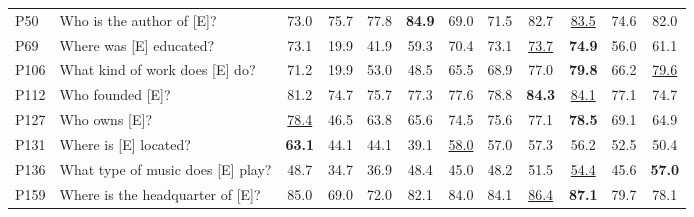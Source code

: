 \documentclass[letterpaper]{article} %
\begin{document}
\begin{table}
{\begin{tabular}{llcccccccccc}
			P50                                                   & Who is the author of [E]?               & 73.0             & 75.7            & 77.8               & \textbf{84.9}    & 69.0                         & 71.5                        & 82.7               & \underline{83.5}  & 74.6                & 82.0                     \\
			P69                                                   & Where was [E] educated?                 & 73.1             & 19.9            & 41.9               & 59.3             & 70.4                         & 73.1                        & \underline{73.7}   & \textbf{74.9}     & 56.0                & 61.1                     \\
			P106                                                  & What kind of work does [E] do?          & 71.2             & 19.9            & 53.0               & 48.5             & 65.5                         & 68.9                        & 77.0               & \textbf{79.8}     & 66.2                & \underline{79.6}         \\
			P112                                                  & Who founded [E]?                        & 81.2             & 74.7            & 75.7               & 77.3             & 77.6                         & 78.8                        & \textbf{84.3}      & \underline{84.1}  & 77.1                & 74.7                     \\
			P127                                                  & Who owns [E]?                           & \underline{78.4} & 46.5            & 63.8               & 65.6             & 74.5                         & 75.6                        & 77.1               & \textbf{78.5}     & 69.1                & 64.9                     \\
			P131                                                  & Where is [E] located?                   & \textbf{63.1}    & 44.1            & 44.1               & 39.1             & \underline{58.0}             & 57.0                        & 57.3               & 56.2              & 52.5                & 50.4                     \\
			P136                                                  & What type of music does [E] play?       & 48.7             & 34.7            & 36.9               & 48.4             & 45.0                         & 48.2                        & 51.5               & \underline{54.4}  & 45.6                & \textbf{57.0}            \\
			P159                                                  & Where is the headquarter of [E]?        & 85.0             & 69.0            & 72.0               & 82.1             & 84.0                         & 84.1                        & \underline{86.4}   & \textbf{87.1}     & 79.7                & 78.1                     \\

\end{tabular}}
\end{table}
\end{document}
